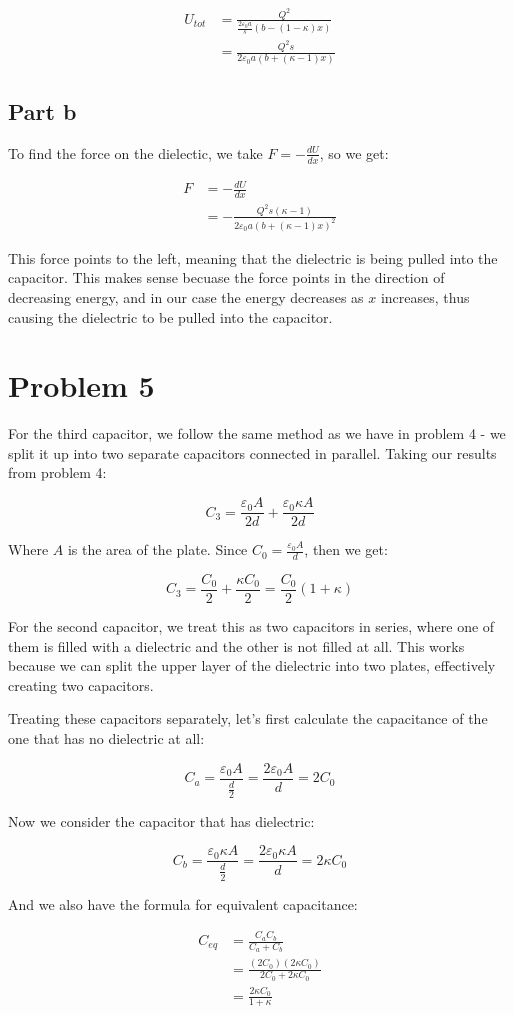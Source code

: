 \documentclass{article}
\theoremstyle{definition}
\numberwithin{equation}{section}
\numberwithin{definition}{section}
\begin{document}
\begin{align*}
    U_{tot} &= \frac{Q^2}{ \frac{2\varepsilon_0 a}{s}(b - (1-\kappa) x)}\\
    &= \frac{Q^2 s}{2\varepsilon_0 a (b + (\kappa - 1) x)}
\end{align*}


\subsection*{Part b}

To find the force on the dielectic, we take $F = -\frac{dU}{dx}$, so we get:

\begin{align*}
    F &= -\frac{dU}{dx}\\
    &= -\frac{Q^2s(\kappa - 1)}{2\varepsilon_0 a(b + (\kappa - 1)x)^2}
\end{align*}

This force points to the left, meaning that the dielectric is being pulled into the capacitor. This makes sense becuase the force points in the direction of decreasing energy, and in our case the energy decreases as $x$ increases, thus causing the dielectric to be pulled into the capacitor.

\section{Problem 5}

For the third capacitor, we follow the same method as we have in problem 4 - we split it up into two separate capacitors connected in parallel. Taking our results from problem 4:

\[ C_3 = \frac{\varepsilon_0 A}{2d} + \frac{\varepsilon_0 \kappa A}{2d}\]

Where $A$ is the area of the plate. Since $C_0 = \frac{\varepsilon_0 A}{d}$, then we get: 

\[ C_3 = \frac{C_0}{2} + \frac{\kappa C_0}{2} = \frac{C_0}{2}(1 + \kappa)\] 

For the second capacitor, we treat this as two capacitors in series, where one of them is filled with a dielectric and the other is not filled at all. This works because we can split the upper layer of the dielectric into two plates, effectively creating two capacitors. 

Treating these capacitors separately, let's first calculate the capacitance of the one that has no dielectric at all:

\[ C_a = \frac{\varepsilon_0 A}{\frac{d}{2}} = \frac{2\varepsilon_0 A}{d} = 2C_0\]

Now we consider the capacitor that has dielectric:

\[ C_b = \frac{\varepsilon_0 \kappa A}{\frac{d}{2}} = \frac{2\varepsilon_0 \kappa A}{d} = 2\kappa C_0\]

And we also have the formula for equivalent capacitance:

\begin{align*}
    C_{eq} &= \frac{C_aC_b}{C_a + C_b}\\
    &= \frac{(2C_0)(2\kappa C_0)}{2C_0 + 2\kappa C_0}\\
    &= \frac{2\kappa C_0}{1 + \kappa}
\end{align*}
\end{document}
